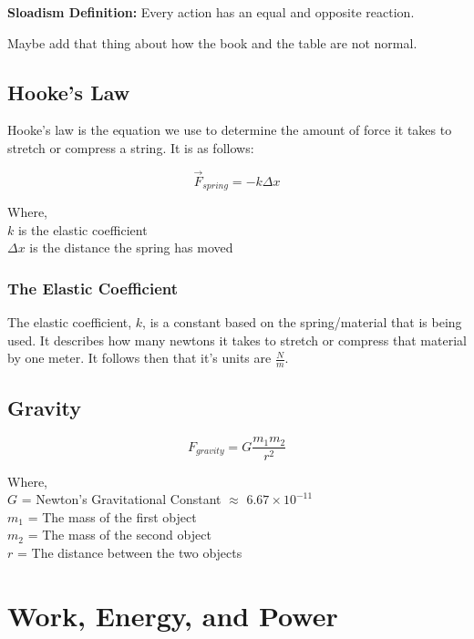 \documentclass{article}
\begin{document}
\noindent \textbf{Sloadism Definition:} Every action has an equal and opposite reaction.

Maybe add that thing about how the book and the table are not normal.

\subsection{Hooke's Law}
Hooke's law is the equation we use to determine the amount of force it takes to stretch or
compress a string. It is as follows:

\begin{equation}\label{eq : hooke}
    \vec{F}_{spring} = -k \Delta x
\end{equation}

\noindent Where, \\
\indent $k$ is the elastic coefficient \\
\indent $\Delta x$ is the distance the spring has moved

\subsubsection{The Elastic Coefficient}
The elastic coefficient, $k$, is a constant based on the spring/material that is being used.
It describes how many newtons it takes to stretch or compress that material by one meter.
It follows then that it's units are $\frac{N}{m}$.
\subsection{Gravity}
\begin{equation}\label{eq : grav force}
    F_{gravity} = G\frac{m_1 m_2}{r^2}
\end{equation}

\noindent Where, \\
\indent $G$ = Newton's Gravitational Constant $\approx$ $6.67 \times 10^{-11}$ \\
\indent $m_1$ = The mass of the first object \\
\indent $m_2$ = The mass of the second object \\
\indent $r$ = The distance between the two objects \\

\newpage
\section{Work, Energy, and Power}
\end{document}
